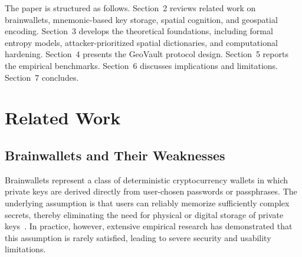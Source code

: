 \documentclass[journal,article,submit,pdftex,moreauthors]{Definitions/mdpi}
\newcommand{\add}[1]{#1}
\newcommand{\remove}[1]{}
\newcommand{\add}[1]{\added{#1}}
\newcommand{\remove}[1]{\deleted{#1}}
\begin{document}
\remove{The remainder of this paper is organized as follows. Section~2 reviews related work on brainwallets, mnemonic-based key storage, human memory limitations, spatial cognition, and geospatial encoding systems, highlighting the shortcomings of existing approaches and motivating the use of spatial memory as a cryptographic primitive. Section~3 introduces the theoretical foundations of the proposed approach, including formal entropy models for linguistic and spatial secrets, effective entropy under attacker-prioritized dictionaries, and the role of computational entropy boosting. Section~4 presents the design of the \textit{GeoVault} protocol, detailing the spatial selection process, geospatial encoding, entropy-boosting mechanisms, and the attacker-defender security evaluation methodology. Section~5 reports empirical results, including spatial entropy analysis, CPU-GPU asymmetry benchmarks, and the impact of memory-hard key derivation on attacker work factors under realistic hardware constraints. Section~6 discusses the implications of the results, examines limitations and threat model assumptions, and positions GeoVault within the broader landscape of human-centered key management. Finally, Section~7 concludes the paper and outlines directions for future research.}\add{The paper is structured as follows. Section~2 reviews related work on brainwallets, mnemonic-based key storage, spatial cognition, and geospatial encoding. Section~3 develops the theoretical foundations, including formal entropy models, attacker-prioritized spatial dictionaries, and computational hardening. Section~4 presents the GeoVault protocol design. Section~5 reports the empirical benchmarks. Section~6 discusses implications and limitations. Section~7 concludes.}

\section{Related Work}

\subsection{Brainwallets and Their Weaknesses}

Brainwallets represent a class of deterministic cryptocurrency wallets in which private keys are derived directly from user-chosen passwords or passphrases. The underlying assumption is that users can reliably memorize sufficiently complex secrets, thereby eliminating the need for physical or digital storage of private keys~\cite{Das2019, Vasek2017}. In practice, however, extensive empirical research has demonstrated that this assumption is rarely satisfied, leading to severe security and usability limitations.
\end{document}
